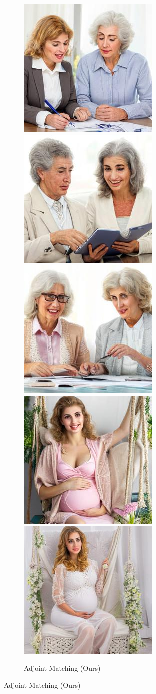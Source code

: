 \begin{figure}[h!]
\begin{subfigure}[t]{0.32\linewidth}
    \end{subfigure}\hfill
    \begin{subfigure}[t]{0.32\linewidth}
    \centering
    \caption*{Adjoint Matching (Ours)}
    	\includegraphics[width=0.32\linewidth]{figs/samples_appendix_4/adjmat_cfg_2_ode_prompt_12_image_0.jpg}\;%
    	\includegraphics[width=0.32\linewidth]{figs/samples_appendix_4/adjmat_cfg_2_ode_prompt_12_image_1.jpg}\;%
    	\includegraphics[width=0.32\linewidth]{figs/samples_appendix_4/adjmat_cfg_2_ode_prompt_12_image_2.jpg}\\ 
    	\includegraphics[width=0.32\linewidth]{figs/samples_appendix_4/adjmat_cfg_2_ode_prompt_16_image_0.jpg}\;%
    	\includegraphics[width=0.32\linewidth]{figs/samples_appendix_4/adjmat_cfg_2_ode_prompt_16_image_1.jpg}\;%

\end{subfigure}
\end{figure}
